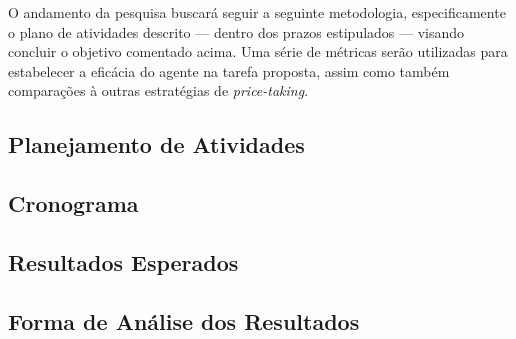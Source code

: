 
O andamento da pesquisa buscará seguir a seguinte metodologia, especificamente o plano de atividades descrito — dentro dos prazos estipulados — visando concluir o objetivo comentado acima. Uma série de métricas serão utilizadas para estabelecer a eficácia do agente na tarefa proposta, assim como também comparações à outras estratégias de \textit{price-taking}.

\subsection{Planejamento de Atividades}
\label{section:activities}


\subsection{Cronograma}
\label{section:chronogram}


\subsection{Resultados Esperados}
\label{section:results}


\subsection{Forma de Análise dos Resultados}
\label{section:metrics}


